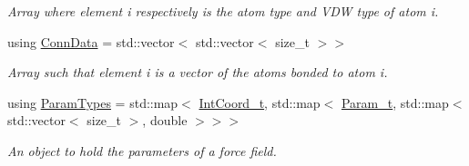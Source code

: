 \begin{DoxyCompactItemize}
\begin{DoxyCompactList}\small\item\em Array where element i respectively is the atom type and V\+DW type of atom i. \end{DoxyCompactList}\item 
using \hyperlink{namespaceFManII_a7c18a61f01fcc0604c39cbfae43665df}{Conn\+Data} = std\+::vector$<$ std\+::vector$<$ size\+\_\+t $>$$>$\hypertarget{namespaceFManII_a7c18a61f01fcc0604c39cbfae43665df}{}\label{namespaceFManII_a7c18a61f01fcc0604c39cbfae43665df}

\begin{DoxyCompactList}\small\item\em Array such that element i is a vector of the atoms bonded to atom i. \end{DoxyCompactList}\item 
using \hyperlink{namespaceFManII_a16edca665b5dfcdf9b3995844ad01bb5}{Param\+Types} = std\+::map$<$ \hyperlink{namespaceFManII_aee2b0c5668a8970ffb58ac650994e059}{Int\+Coord\+\_\+t}, std\+::map$<$ \hyperlink{namespaceFManII_ab331802fde4c5f2564443f1704c25363}{Param\+\_\+t}, std\+::map$<$ std\+::vector$<$ size\+\_\+t $>$, double $>$$>$$>$
\begin{DoxyCompactList}\small\item\em An object to hold the parameters of a force field. \end{DoxyCompactList}\end{DoxyCompactItemize}
